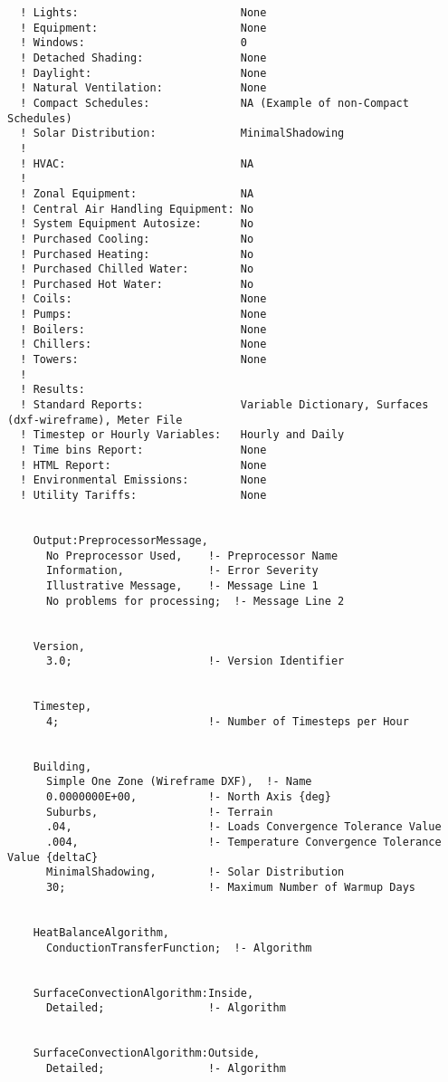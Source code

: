 \begin{lstlisting}
  ! Lights:                         None
  ! Equipment:                      None
  ! Windows:                        0
  ! Detached Shading:               None
  ! Daylight:                       None
  ! Natural Ventilation:            None
  ! Compact Schedules:              NA (Example of non-Compact Schedules)
  ! Solar Distribution:             MinimalShadowing
  !
  ! HVAC:                           NA
  !
  ! Zonal Equipment:                NA
  ! Central Air Handling Equipment: No
  ! System Equipment Autosize:      No
  ! Purchased Cooling:              No
  ! Purchased Heating:              No
  ! Purchased Chilled Water:        No
  ! Purchased Hot Water:            No
  ! Coils:                          None
  ! Pumps:                          None
  ! Boilers:                        None
  ! Chillers:                       None
  ! Towers:                         None
  !
  ! Results:
  ! Standard Reports:               Variable Dictionary, Surfaces (dxf-wireframe), Meter File
  ! Timestep or Hourly Variables:   Hourly and Daily
  ! Time bins Report:               None
  ! HTML Report:                    None
  ! Environmental Emissions:        None
  ! Utility Tariffs:                None


    Output:PreprocessorMessage,
      No Preprocessor Used,    !- Preprocessor Name
      Information,             !- Error Severity
      Illustrative Message,    !- Message Line 1
      No problems for processing;  !- Message Line 2


    Version,
      3.0;                     !- Version Identifier


    Timestep,
      4;                       !- Number of Timesteps per Hour


    Building,
      Simple One Zone (Wireframe DXF),  !- Name
      0.0000000E+00,           !- North Axis {deg}
      Suburbs,                 !- Terrain
      .04,                     !- Loads Convergence Tolerance Value
      .004,                    !- Temperature Convergence Tolerance Value {deltaC}
      MinimalShadowing,        !- Solar Distribution
      30;                      !- Maximum Number of Warmup Days


    HeatBalanceAlgorithm,
      ConductionTransferFunction;  !- Algorithm


    SurfaceConvectionAlgorithm:Inside,
      Detailed;                !- Algorithm


    SurfaceConvectionAlgorithm:Outside,
      Detailed;                !- Algorithm



\end{lstlisting}
